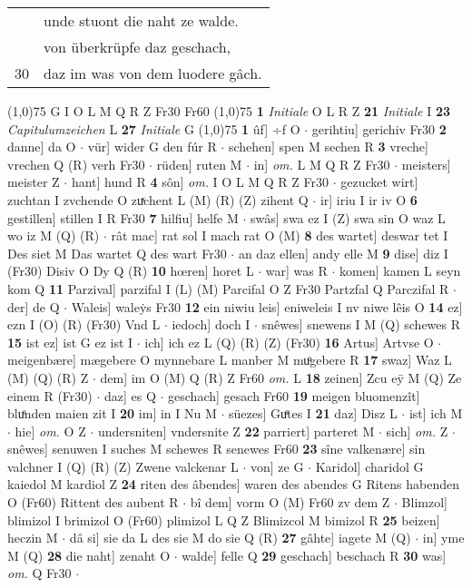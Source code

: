 \documentclass[8pt,a4paper,notitlepage]{article}
\begin{document}
\begin{table}[ht]
\begin{minipage}[t]{0.5\linewidth}
\begin{tabular}{rl}
 & unde stuont die naht ze walde.\\ 
 & von überkrüpfe daz geschach,\\ 
30 & daz im was von dem luodere gâch.\\ 
\end{tabular}
\scriptsize
\line(1,0){75} \newline
G I O L M Q R Z Fr30 Fr60 \newline
\line(1,0){75} \newline
\textbf{1} \textit{Initiale} O L R Z  \textbf{21} \textit{Initiale} I  \textbf{23} \textit{Capitulumzeichen} L  \textbf{27} \textit{Initiale} G  \newline
\line(1,0){75} \newline
\textbf{1} ûf] ÷f O  $\cdot$ gerihtiu] gerichiv Fr30 \textbf{2} danne] da O  $\cdot$ vür] wider G den fúr R  $\cdot$ schehen] spen M sechen R \textbf{3} vreche] vrechen Q (R) verh Fr30  $\cdot$ rüden] ruten M  $\cdot$ in] \textit{om.} L M Q R Z Fr30  $\cdot$ meisters] meister Z  $\cdot$ hant] hund R \textbf{4} sôn] \textit{om.} I O L M Q R Z Fr30  $\cdot$ gezucket wirt] zuchtan I zvchende O zuͯchent L (M) (R) (Z) zihent Q  $\cdot$ ir] iriu I ir iv O \textbf{6} gestillen] stillen I R Fr30 \textbf{7} hilfiu] helfe M  $\cdot$ swâs] swa ez I (Z) swa sin O waz L wo iz M (Q) (R)  $\cdot$ rât mac] rat sol I mach rat O (M) \textbf{8} des wartet] deswar tet I Des siet M Das wartet Q des wart Fr30  $\cdot$ an daz ellen] andy elle M \textbf{9} dise] diz I (Fr30) Disiv O Dy Q (R) \textbf{10} hœren] horet L  $\cdot$ war] was R  $\cdot$ komen] kamen L seyn kom Q \textbf{11} Parzival] parzifal I (L) (M) Parcifal O Z Fr30 Partzfal Q Parczifal R  $\cdot$ der] de Q  $\cdot$ Waleis] waleẏs Fr30 \textbf{12} ein niwiu leis] eniweleis I nv niwe lêis O \textbf{14} ez] ezn I (O) (R) (Fr30) Vnd L  $\cdot$ iedoch] doch I  $\cdot$ snêwes] snewens I M (Q) schewes R \textbf{15} ist ez] ist G ez ist I  $\cdot$ ich] ich ez L (Q) (R) (Z) (Fr30) \textbf{16} Artus] Artvse O  $\cdot$ meigenbære] mægebere O mynnebare L manber M muͦgebere R \textbf{17} swaz] Waz L (M) (Q) (R) Z  $\cdot$ dem] im O (M) Q (R) Z Fr60 \textit{om.} L \textbf{18} zeinen] Zcu eȳ M (Q) Ze einem R (Fr30)  $\cdot$ daz] es Q  $\cdot$ geschach] gesach Fr60 \textbf{19} meigen bluomenzît] bluͤnden maien zit I \textbf{20} im] in I Nu M  $\cdot$ süezes] Guͤtes I \textbf{21} daz] Disz L  $\cdot$ ist] ich M  $\cdot$ hie] \textit{om.} O Z  $\cdot$ undersniten] vndersnite Z \textbf{22} parriert] parteret M  $\cdot$ sich] \textit{om.} Z  $\cdot$ snêwes] senuwen I suches M schewes R senewes Fr60 \textbf{23} sîne valkenære] sin valchner I (Q) (R) (Z) Zwene valckenar L  $\cdot$ von] ze G  $\cdot$ Karidol] charidol G kaiedol M kardiol Z \textbf{24} riten des âbendes] waren des abendes G Ritens habenden O (Fr60) Rittent des aubent R  $\cdot$ bî dem] vorm O (M) Fr60 zv dem Z  $\cdot$ Blimzol] blimizol I brimizol O (Fr60) plimizol L Q Z Blimizcol M bimizol R \textbf{25} beizen] heczin M  $\cdot$ dâ si] sie da L des sie M do sie Q (R) \textbf{27} gâhte] iagete M (Q)  $\cdot$ in] yme M (Q) \textbf{28} die naht] zenaht O  $\cdot$ walde] felle Q \textbf{29} geschach] beschach R \textbf{30} was] \textit{om.} Q Fr30  $\cdot$ 
\end{minipage}
\end{table}
\end{document}

